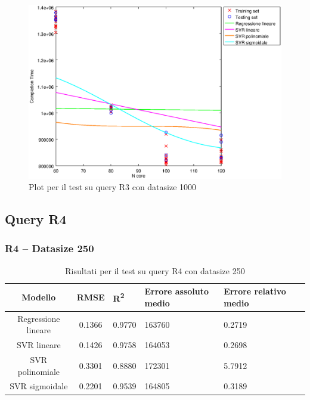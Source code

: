 \documentclass[a4paper,11pt]{article}
\begin{document}
\begin {figure}[hbtp]
\centering
\includegraphics[width=\textwidth]{output/R3_1000/plot_R3_1000.eps}
\caption {Plot per il test su query R3 con datasize 1000}
\end {figure}

\newpage
\subsection{Query R4}

\subsubsection{R4 -- Datasize 250}
\begin{table}[bhpt]
	\centering
	\begin{adjustbox}{center}
		\begin{tabular}{c | c M{1cm} M{2.5cm} M{2.5cm} M{1.8cm}}
			Modello & RMSE & R\textsuperscript{2} & Errore assoluto medio & Errore relativo medio \tabularnewline
			\hline
			Regressione lineare & 0.1366 & 0.9770 & 163760 & 0.2719 \\
			SVR lineare & 0.1426 & 0.9758 & 164053 & 0.2698 \\
			SVR polinomiale & 0.3301 & 0.8880 & 172301 & 5.7912 \\
			SVR sigmoidale & 0.2201 & 0.9539 & 164805 & 0.3189 \\
		\end{tabular}
	\end{adjustbox}
	\\
	\caption{Risultati per il test su query R4 con datasize 250}
	\label{table_R4_250}
\end{table}
\end{document}
